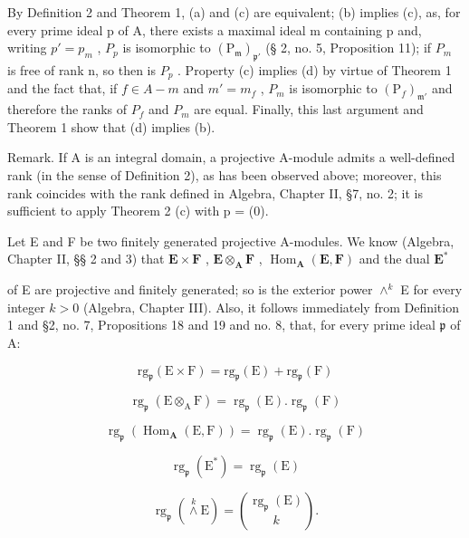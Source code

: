 By Definition 2 and Theorem 1, (a) and (c) are equivalent; (b) implies (c), as, for every prime ideal p of A, there exists a maximal ideal m containing p and, writing \(p' = p_{m}\) , \(P_{p}\) is isomorphic to \((\mathrm{P}_{\mathfrak{m}})_{\mathfrak{p'}}\) (§ 2, no. 5, Proposition 11); if \(P_{m}\) is free of rank n, so then is \(P_{p}\) . Property (c) implies (d) by virtue of Theorem 1 and the fact that, if \(f \in A - m\) and \(m' = m_{f}\) , \(P_{m}\) is isomorphic to \((\mathrm{P}_{f})_{\mathfrak{m'}}\) and therefore the ranks of \(P_{f}\) and \(P_{m}\) are equal. Finally, this last argument and Theorem 1 show that (d) implies (b).

Remark. If A is an integral domain, a projective A-module admits a well-defined rank (in the sense of Definition 2), as has been observed above; moreover, this rank coincides with the rank defined in Algebra, Chapter II, §7, no. 2; it is sufficient to apply Theorem 2 (c) with p = (0).

Let E and F be two finitely generated projective A-modules. We know (Algebra, Chapter II, §§ 2 and 3) that \(\mathbf{E} \times \mathbf{F}\) , \(\mathbf{E} \otimes_{\mathbf{A}} \mathbf{F}\) , \(\operatorname{Hom}_{\mathbf{A}}(\mathbf{E}, \mathbf{F})\) and the dual \(\mathbf{E}^*\)

of E are projective and finitely generated; so is the exterior power \(\wedge^k\) E for every integer \(k > 0\) (Algebra, Chapter III). Also, it follows immediately from Definition 1 and §2, no. 7, Propositions 18 and 19 and no. 8, that, for every prime ideal \(\mathfrak{p}\) of A:

\[
\mathrm{rg} _ {\mathfrak {p}} (\mathrm{E} \times \mathrm{F}) = \mathrm{rg} _ {\mathfrak {p}} (\mathrm{E}) + \mathrm{rg} _ {\mathfrak {p}} (\mathrm{F})\tag{1}
\]

\[
\operatorname{rg} _ {\mathfrak {p}} (\mathrm{E} \otimes_ {\mathrm{A}} \mathrm{F}) = \operatorname{rg} _ {\mathfrak {p}} (\mathrm{E}). \operatorname{rg} _ {\mathfrak {p}} (\mathrm{F})\tag{2}
\]

\[
\operatorname{rg} _ {\mathfrak {p}} (\operatorname{Hom} _ {\mathbf {A}} (\mathrm{E}, \mathrm{F})) = \operatorname{rg} _ {\mathfrak {p}} (\mathrm{E}). \operatorname{rg} _ {\mathfrak {p}} (\mathrm{F})\tag{3}
\]

\[
\operatorname{rg} _ {\mathfrak {p}} (\mathrm{E} ^ {*}) = \operatorname{rg} _ {\mathfrak {p}} (\mathrm{E})\tag{4}
\]

\[
\operatorname{rg} _ {\mathfrak {p}} (\overset {k} {\wedge} \mathrm{E}) = \binom{\operatorname{rg} _ {\mathfrak {p}} (\mathrm{E})}{k}.\tag{5}
\]

